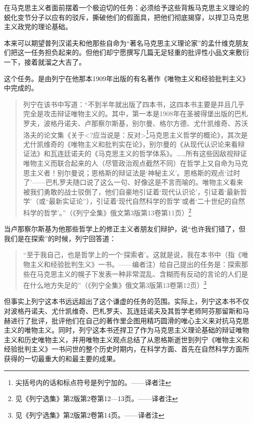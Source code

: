 在马克思主义者面前摆着一个极迫切的任务：必须给予这些背叛马克思主义理论的蜕化变节分子以应有的驳斥，撕破他们的假面具，把他们彻底揭穿，以捍卫马克思主义政党的理论基础。

本来可以期望普列汉诺夫和他那些自命为“著名马克思主义理论家”的孟什维克朋友们把这一任务担负起来的。但他们却宁愿撰写几篇无足轻重的批评性小品文来敷衍一下，接着就溜之大吉了。

这个任务。是由列宁在他那本1909年出版的有名著作《唯物主义和经验批判主义》中完成的。

\begin{quotation}
列宁在该书中写道：“不到半年就出版了四本书，这四本书主要是并且几乎完全是攻击辩证唯物主义的。其中，第一本是1908年在圣被得堡出版的巴札罗夫，波格丹诺夫、卢那察尔斯基，别尔曼、格尔方德、尤什凯维奇、苏沃洛夫的论文集《关于<?应当说是：反对>\footnote{尖括号内的话和标点符号是列宁加的。——译者注}马克思主义哲学的概论》，其次是尤什凯维奇的《唯物主义和批判实在论》，别尔曼的《从现代认识论来看辩证法》和瓦连廷诺夫的《马克思主义的哲学体系》。……所有这些因敌视辩证唯物主义而联合起来的人（尽管政治观点截然不同）在哲学上又自命为马克思主义者！别尔曼说；恩格斯的辩证法是‘神秘主义’。恩格斯的观点‘过时了’——巴札罗夫随口说了这么一句、好像这是不言而喻的。唯物主义看来被我们勇敢的战士驳倒了，他们自豪地引证着‘现代认识论’，引证着‘最新哲学’（或“最新实证论”），引证着‘现代自然科学的哲学’或者‘二十世纪的自然科学的哲学’。”（《列宁全集》俄文第3版第13卷第11页）\footnote{见《列宁选集》第2版第2卷第12—13页。——译者注}
\end{quotation}

当卢那察尔斯基为他那些哲学上的修正主义者朋友们辩护，说“也许我们错了，但我们是在探索”的时候，列宁回答道：

\begin{quotation}
“至于我自己，也是哲学上的一个‘探索者’。这就是说，我在本书中（指《唯物主义和经验批判生义》一书。——编者注）给自己提出的任务是：探索那些在马克思主义的幌子下发表一种非常混乱、含糊而有反动的言论的人们是在什么地方失足的”（《列宁全集》俄文第3版第13卷第12页）\footnote{见《列宁选集》第2版第2卷第14页。——译者注}
\end{quotation}

但事实上列宁这本书远远超出了这个谦虚的任务的范围。实际上，列宁这本书不仅对波格丹诺夫、尤什凯维奇、巴札罗夫、瓦连廷诺夫及其哲学老师阿芬那留斯和马赫进行了批评，批评他们在自己的著作里企图用精巧圆滑的唯心主义来对抗马克思主义的唯物主义。同时，列宁这本书还捍卫了作为马克思主义理论基础的辩证唯物主义和历史唯物主义，并用唯物主义观点总结了从恩格斯逝世到列宁《唯物主义和经验批判主义》一书问世的整个历史时期内，在科学方面、首先在自然科学方面所获得的一切最重大的和最主要的成果。

